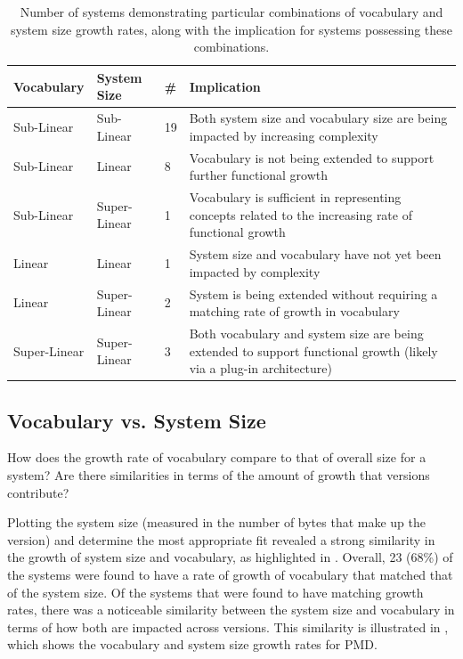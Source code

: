 \begin{table}[t]
\centering
\begin{tabular}{|p{}|p{}|p{}|p{}|}
\hline
{\bf Vocabulary} & {\bf System Size} & {\bf \#} & {\bf Implication} \\
\hline
\hline
Sub-Linear
&
Sub-Linear
&
19
&
Both system size and vocabulary size are being impacted by increasing complexity
\\
\hline
Sub-Linear
&
Linear
&
8
&
Vocabulary is not being extended to support further functional growth
\\
\hline
Sub-Linear
&
Super-Linear
&
1
&
Vocabulary is sufficient in representing concepts related to the increasing rate of functional growth
\\
\hline
Linear
&
Linear
&
1
&
System size and vocabulary have not yet been impacted by complexity
\\
\hline
Linear
&
Super-Linear
&
2
&
System is being extended without requiring a matching rate of growth in vocabulary
\\
\hline
Super-Linear
&
Super-Linear
&
3
&
Both vocabulary and system size are being extended to support functional growth (likely via a plug-in architecture)
\\
\hline
\end{tabular}
\vspace{0.2cm}
\caption{Number of systems demonstrating particular combinations of vocabulary and system size growth rates, along with the implication for systems possessing these combinations.}
\label{tab:growth_rate_results}
\vspace{-0.2cm}
\end{table}


\subsection{Vocabulary vs. System Size} %
\label{ssub:vocabulary_vs_system_size}

How does the growth rate of vocabulary compare to that of overall size for a system? Are there similarities in terms of the amount of growth that versions contribute?

Plotting the system size (measured in the number of bytes that make up the version) and determine the most appropriate fit revealed a strong similarity in the growth of system size and vocabulary, as highlighted in . Overall, 23 (68\%) of the systems were found to have a rate of growth of vocabulary that matched that of the system size. Of the systems that were found to have matching growth rates, there was a noticeable similarity between the system size and vocabulary in terms of how both are impacted across versions. This similarity is illustrated in , which shows the vocabulary and system size growth rates for PMD.

